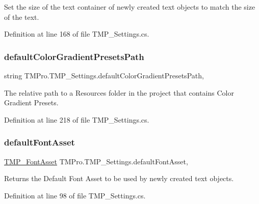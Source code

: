 Set the size of the text container of newly created text objects to match the size of the text. 



Definition at line 168 of file T\+M\+P\+\_\+\+Settings.\+cs.

\mbox{\label{class_t_m_pro_1_1_t_m_p___settings_a3a6d7260b925a52e2c0e10ef9b91aed6}} 
\subsubsection{\texorpdfstring{defaultColorGradientPresetsPath}{defaultColorGradientPresetsPath}}
{\footnotesize\ttfamily string T\+M\+Pro.\+T\+M\+P\+\_\+\+Settings.\+default\+Color\+Gradient\+Presets\+Path\hspace{0.3cm}{\ttfamily [static]}, {\ttfamily [get]}}



The relative path to a Resources folder in the project that contains Color Gradient Presets. 



Definition at line 218 of file T\+M\+P\+\_\+\+Settings.\+cs.

\mbox{\label{class_t_m_pro_1_1_t_m_p___settings_a662e85495fdb4320e6d01287cc673220}} 
\subsubsection{\texorpdfstring{defaultFontAsset}{defaultFontAsset}}
{\footnotesize\ttfamily \mbox{\hyperlink{class_t_m_pro_1_1_t_m_p___font_asset}{T\+M\+P\+\_\+\+Font\+Asset}} T\+M\+Pro.\+T\+M\+P\+\_\+\+Settings.\+default\+Font\+Asset\hspace{0.3cm}{\ttfamily [static]}, {\ttfamily [get]}}



Returns the Default Font Asset to be used by newly created text objects. 



Definition at line 98 of file T\+M\+P\+\_\+\+Settings.\+cs.

